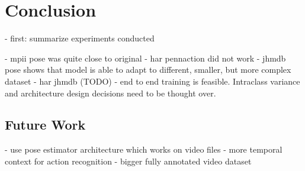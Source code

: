 \chapter{Conclusion}
\label{sec:chapter6}

- first: summarize experiments conducted

- mpii pose was quite close to original
- har pennaction did not work 
- jhmdb pose shows that model is able to adapt to different, smaller, but more complex dataset
- har jhmdb (TODO)
- end to end training is feasible. Intraclass variance and architecture design decisions need to be thought over.

\section{Future Work}
- use pose estimator architecture which works on video files
- more temporal context for action recognition
- bigger fully annotated video dataset